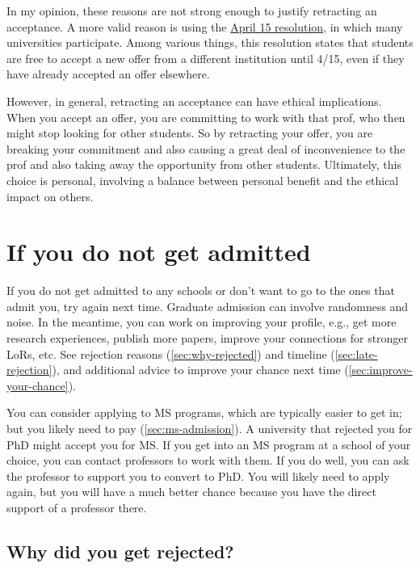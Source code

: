 \documentclass[oneside,11pt,dvipsnames]{book}
\begin{document}
In my opinion, these reasons are not strong enough to justify retracting an acceptance. A more valid reason is using the \href{https://cgsnet.org/wp-content/uploads/2024/01/CGS_April15_Resolution_Jan312024.pdf}{April 15 resolution}, in which many universities participate. Among various things, this resolution states that students are free to accept a new offer from a different institution until 4/15, even if they have already accepted an offer elsewhere. 

However, in general, retracting an acceptance can have ethical implications. When you accept an offer, you are committing to work with that prof, who then might stop looking for other students. So by retracting your offer, you are breaking your commitment and also causing a great deal of inconvenience to the prof and also taking away the opportunity from other students. 
Ultimately, this choice is personal, involving a balance between personal benefit and the ethical impact on others. 


\section{If you do not get admitted}\label{sec:not-accepted} 

If you do not get admitted to any schools or don't want to go to the ones that admit you, try again next time.  Graduate admission can involve randomness and noise. In the meantime, you can work on improving your profile, e.g., get more research experiences, publish more papers, improve your connections for stronger LoRs, etc. See rejection reasons (\autoref{sec:why-rejected}) and timeline (\autoref{sec:late-rejection}), and additional advice to improve your chance next time (\autoref{sec:improve-your-chance}).

You can consider applying to MS programs, which are typically easier to get in; but you likely need to pay (\autoref{sec:ms-admission}).  A university that rejected you for PhD might accept you for MS.
If you get into an MS program at a school of your choice, you can contact professors to work with them. If you do well, you can ask the professor to support you to convert to PhD. You will likely need to apply again, but you will have a much better chance because you have the direct support of a professor there.

\subsection{Why did you get rejected?}\label{sec:why-rejected}
\end{document}
